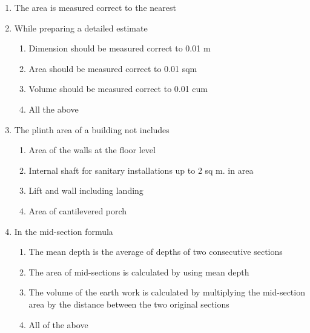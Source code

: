 \documentclass[11pt,a4paper]{article}
\begin{document}
\begin{enumerate}
\\
\item{The area is measured correct to the nearest}
\\
\item{While preparing a detailed estimate}
\begin{enumerate}[label=\Alph*.]
\item{Dimension should be measured correct to 0.01 m}
\item{Area should be measured correct to 0.01 sqm}
\item{Volume should be measured correct to 0.01 cum}
\item{All the above}
\end{enumerate}
\item{The plinth area of a building not includes}
\begin{enumerate}[label=\Alph*.]
\item{Area of the walls at the floor level}
\item{Internal shaft for sanitary installations up to 2 sq m. in area}
\item{Lift and wall including landing}
\item{Area of cantilevered porch}
\end{enumerate}
\item{In the mid-section formula}
\begin{enumerate}[label=\Alph*.]
\item{The mean depth is the average of depths of two consecutive sections}
\item{The area of mid-sections is calculated by using mean depth}
\item{The volume of the earth work is calculated by multiplying the mid-section area by the distance between the two original sections}
\item{All of the above}

\end{enumerate}
\end{enumerate}
\end{document}
